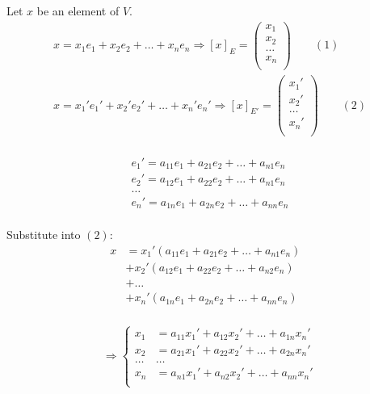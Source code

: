    \par Let $x$ be an element of $V$.
    \begin{align*}
      x = x_{1} e_{1}   + x_{2} e_{2}   + \ldots + x_{n} e_{n}
        \Rightarrow [x]_{E} = 
          \begin{pmatrix}
            x_{1}  \\
            x_{2}  \\
            \ldots \\
            x_{n}  \\
          \end{pmatrix} \qquad (1) \\
      x = x_{1}' e_{1}' + x_{2}' e_{2}' + \ldots + x_{n}' e_{n}'
        \Rightarrow [x]_{E'} = 
          \begin{pmatrix}
            x_{1}'  \\
            x_{2}'  \\
            \ldots \\
            x_{n}'  \\
          \end{pmatrix} \qquad (2) \\
    \end{align*}

    \begin{align*}
      e_{1}' = a_{11} e_{1} + a_{21} e_{2} + \ldots + a_{n1} e_{n} \\
      e_{2}' = a_{12} e_{1} + a_{22} e_{2} + \ldots + a_{n1} e_{n} \\
      \ldots \\ 
      e_{n}' = a_{1n} e_{1} + a_{2n} e_{2} + \ldots + a_{nn} e_{n} \\
    \end{align*}

    \par Substitute into $(2)$:
    \begin{align*}
      x &= x_{1}'(a_{11} e_{1} + a_{21} e_{2} + \ldots + a_{n1} e_{n}) & \\
        &+ x_{2}'(a_{12} e_{1} + a_{22} e_{2} + \ldots + a_{n2} e_{n}) & \\
        &+ \ldots &\\
        &+ x_{n}'(a_{1n} e_{1} + a_{2n} e_{2} + \ldots + a_{nn} e_{n}) &\\
    \end{align*}

    \begin{align*}
      \Rightarrow \left\{
      \begin{aligned}
        x_{1} &= a_{11}x_{1}' + a_{12}x_{2}' + \ldots + a_{1n}x_{n}' \\
        x_{2} &= a_{21}x_{1}' + a_{22}x_{2}' + \ldots + a_{2n}x_{n}' \\
        \ldots & \ldots \\
        x_{n} &= a_{n1}x_{1}' + a_{n2}x_{2}' + \ldots + a_{nn}x_{n}' \\
      \end{aligned}
      \right.
    \end{align*}

